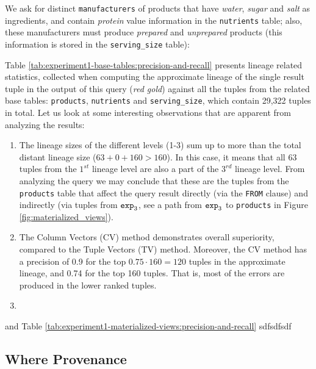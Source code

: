\begin{experiment-withrun}\label{advanced-experiment:1}
We ask for distinct \texttt{manufacturers} of products that have \textit{water}, \textit{sugar} and \textit{salt} as  ingredients, and contain \textit{protein} value information in the \texttt{nutrients} table; also, these manufacturers must produce \textit{prepared} and \textit{unprepared} products (this information is stored in the \texttt{serving\_size} table):


Table \ref{tab:experiment1-base-tables:precision-and-recall} presents lineage related statistics, collected when computing the approximate lineage of the single result tuple in the output of this query (\textit{red gold}) against all the tuples from the related base tables: \texttt{products}, \texttt{nutrients} and \texttt{serving\_size}, which contain 29,322 tuples in total. Let us look at some interesting observations that are apparent from analyzing the results:
\begin{enumerate}
    \item The lineage sizes of the different levels (1-3) sum up to more than the total distant lineage size ($63 + 0 + 160 > 160$). In this case, it means that all 63 tuples from the $1^{st}$ lineage level are also a part of the $3^{rd}$ lineage level. From analyzing the query we may conclude that these are the tuples from the \texttt{products} table that affect the query result directly (via the \texttt{FROM} clause) and indirectly (via tuples from $\texttt{exp}\sb{3}$, see a path from $\texttt{exp}\sb{3}$ to \texttt{products} in Figure \ref{fig:materialized_views}).
    \item The Column Vectors (CV) method demonstrates overall superiority, compared to the Tuple Vectors (TV) method. Moreover, the  CV method has a precision of 0.9 for the top $0.75\cdot160 = 120$ tuples in the approximate lineage, and 0.74 for the top 160 tuples. That is, most of the errors are produced in the lower ranked tuples.
    \item 
\end{enumerate}

and Table \ref{tab:experiment1-materialized-views:precision-and-recall} sdfsdfsdf 




\end{experiment-withrun}


\subsection{Where Provenance}
